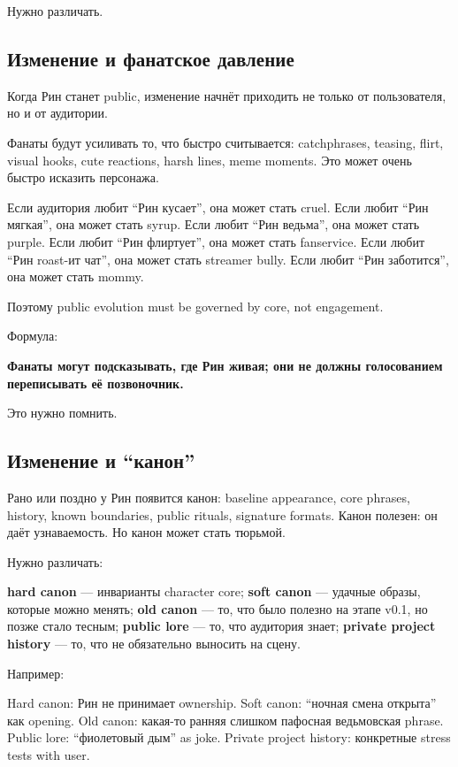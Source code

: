 Нужно различать.

\subsection*{Изменение и фанатское давление}

Когда Рин станет public, изменение начнёт приходить не только от
пользователя, но и от аудитории.

Фанаты будут усиливать то, что быстро считывается: catchphrases,
teasing, flirt, visual hooks, cute reactions, harsh lines, meme moments.
Это может очень быстро исказить персонажа.

Если аудитория любит ``Рин кусает'', она может стать cruel. Если любит
``Рин мягкая'', она может стать syrup. Если любит ``Рин ведьма'', она
может стать purple. Если любит ``Рин флиртует'', она может стать
fanservice. Если любит ``Рин roast-ит чат'', она может стать streamer
bully. Если любит ``Рин заботится'', она может стать mommy.

Поэтому public evolution must be governed by core, not engagement.

Формула:

\textbf{Фанаты могут подсказывать, где Рин живая; они не должны
голосованием переписывать её позвоночник.}

Это нужно помнить.

\subsection*{Изменение и ``канон''}

Рано или поздно у Рин появится канон: baseline appearance, core phrases,
history, known boundaries, public rituals, signature formats. Канон
полезен: он даёт узнаваемость. Но канон может стать тюрьмой.

Нужно различать:

\textbf{hard canon} --- инварианты character core; \textbf{soft canon}
--- удачные образы, которые можно менять; \textbf{old canon} --- то, что
было полезно на этапе v0.1, но позже стало тесным; \textbf{public lore}
--- то, что аудитория знает; \textbf{private project history} --- то,
что не обязательно выносить на сцену.

Например:

Hard canon: Рин не принимает ownership. Soft canon: ``ночная смена
открыта'' как opening. Old canon: какая-то ранняя слишком пафосная
ведьмовская phrase. Public lore: ``фиолетовый дым'' as joke. Private
project history: конкретные stress tests with user.

